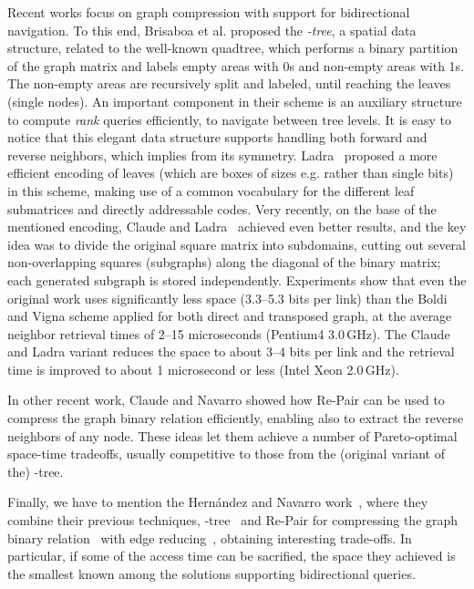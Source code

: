 \documentclass[envcountsame]{llncs}
\begin{document}
Recent works focus on graph compression with support for bidirectional navigation.
To this end, Brisaboa et al. \cite{BLNspire09.1} proposed the {\em -tree}, 
a spatial data structure, 
related to the well-known quadtree, which performs a binary partition of the graph 
matrix and labels empty areas with 0s and non-empty areas with 1s. The non-empty 
areas are recursively split and labeled, until reaching the leaves (single nodes).
An important component in their scheme is an auxiliary structure to compute {\em rank}
queries \cite{Jac89} efficiently, to navigate between tree levels.
It is easy to notice that this elegant data structure supports handling both forward  
and reverse neighbors, which implies from its symmetry. 
Ladra~\cite{L11} proposed a more efficient encoding of leaves (which 
are boxes of sizes e.g.  rather than single bits)
in this scheme, making use of a common vocabulary for the different 
leaf submatrices and directly addressable codes.
Very recently, on the base of the mentioned encoding, Claude and Ladra~\cite{CL11} 
achieved even better results, and the key idea was to divide the original square matrix 
into subdomains, cutting out several non-overlapping squares (subgraphs) 
along the diagonal of the binary matrix; each generated subgraph is stored independently.
Experiments show that even the original work uses significantly less space 
(3.3--5.3 bits per link) than the Boldi and Vigna 
scheme applied for both direct and transposed graph, at the average neighbor retrieval 
times of 2--15 microseconds (Pentium4 3.0\,GHz).
The Claude and Ladra variant reduces the space to about 3--4 bits per link 
and the retrieval time is improved to about 1 microsecond or less (Intel Xeon 2.0\,GHz).

In other recent work, Claude and Navarro \cite{DBLP:conf/birthday/ClaudeN10} showed 
how Re-Pair can be used to compress the graph binary relation efficiently, enabling 
also to extract the reverse neighbors of any node. These ideas let them achieve 
a number of Pareto-optimal space-time tradeoffs, usually competitive to those from 
the (original variant of the) -tree.

Finally, we have to mention the Hern{\'a}ndez and Navarro work~\cite{HNsnakdd11}, 
where they combine their previous techniques, -tree~\cite{BLNspire09.1} 
and Re-Pair for compressing the graph binary relation~\cite{DBLP:conf/birthday/ClaudeN10} 
with edge reducing~\cite{DBLP:conf/wsdm/BuehrerC08}, obtaining interesting trade-offs.
In particular, if some of the access time can be sacrified, the space they achieved is 
the smallest known among the solutions supporting bidirectional queries.
\end{document}
